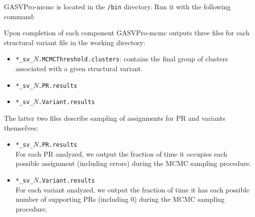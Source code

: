 \documentclass[11pt]{article}
\begin{document}
\noindent GASVPro-mcmc is located in the \verb+/bin+ directory. Run it with the following command:
\begin{framed}
\end{framed}

\noindent Upon completion of each component GASVPro-mcmc outputs three files for each structural variant file in the working directory: 
\begin{itemize}
	\item[] \verb+*_sv_+{\em N}\verb+.MCMCThreshold.clusters+: contains the final group of clusters associated with a given structural variant.
	\item[] \verb+*_sv_+{\em N}\verb+.PR.results+
	\item[] \verb+*_sv_+{\em N}\verb+.Variant.results+
\end{itemize}

\noindent The latter two files describe sampling of assignments for PR and variants themselves:
\begin{itemize}
\item[] \verb+*_sv_+{\em N}\verb+.PR.results+ \\
For each PR analyzed, we output the fraction of time it occupies each possible
assignment (including errors) during the MCMC sampling procedure. 
\item[] \verb+*_sv_+{\em N}\verb+.Variant.results+ \\
For each variant analyzed, we output the fraction of time it has each possible number of supporting PRs (including 0) during the MCMC sampling procedure.
\end{itemize}
\end{document}
